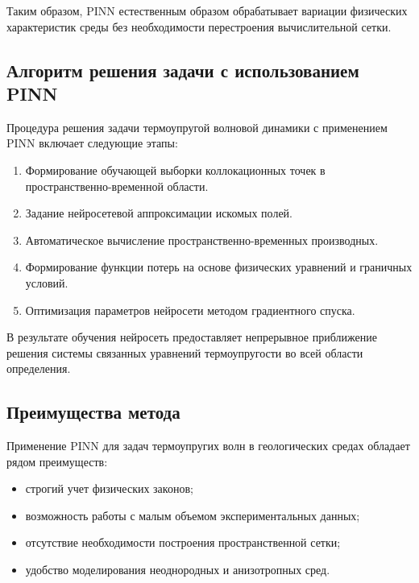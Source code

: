 \documentclass[12pt]{article}
\begin{document}
Таким образом, PINN естественным образом обрабатывает вариации физических характеристик среды без необходимости перестроения вычислительной сетки.

\subsection{Алгоритм решения задачи с использованием PINN}

Процедура решения задачи термоупругой волновой динамики с применением PINN включает следующие этапы:
\begin{enumerate}
    \item Формирование обучающей выборки коллокационных точек в пространственно-временной области.
    \item Задание нейросетевой аппроксимации искомых полей.
    \item Автоматическое вычисление пространственно-временных производных.
    \item Формирование функции потерь на основе физических уравнений и граничных условий.
    \item Оптимизация параметров нейросети методом градиентного спуска.
\end{enumerate}

В результате обучения нейросеть предоставляет непрерывное приближение решения системы связанных уравнений термоупругости во всей области определения.

\subsection{Преимущества метода}

Применение PINN для задач термоупругих волн в геологических средах обладает рядом преимуществ:
\begin{itemize}
    \item строгий учет физических законов;
    \item возможность работы с малым объемом экспериментальных данных;
    \item отсутствие необходимости построения пространственной сетки;
    \item удобство моделирования неоднородных и анизотропных сред.
\end{itemize}
\end{document}
